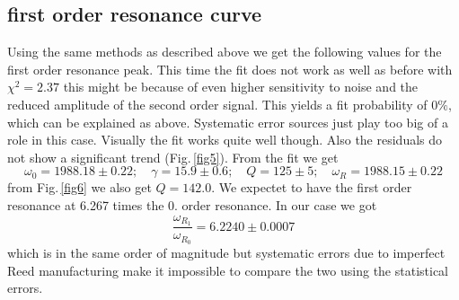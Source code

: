 \subsection{first order resonance curve}
Using the same methods as described above we get the following values for the first order resonance peak.
This time the fit does not work as well as before with $\chi^2 = 2.37$ this might be because of even higher sensitivity to noise and the reduced amplitude of the second order signal. This yields a fit probability of $0\%$, which can be explained as above. Systematic error sources just play too big of a role in this case. Visually the fit works quite well though. Also the residuals do not show a significant trend (Fig.\,\ref{fig5}). From the fit we get
\begin{equation}
	\omega_0 = 1988.18\pm0.22; \,\,\,\,\,\, \gamma = 15.9\pm0.6; \,\,\,\,\,\,Q = 125\pm5; \,\,\,\,\,\,\omega_R = 1988.15\pm0.22
\end{equation}
from Fig.\,\ref{fig6} we also get $Q = 142.0$. We expectet to have the first order resonance at 6.267 times the 0. order resonance. In our case we got
\begin{equation}
	\frac{\omega_{R_1}}{\omega_{R_0}} = 6.2240\pm0.0007
\end{equation}
which is in the same order of magnitude but systematic errors due to imperfect Reed manufacturing make it impossible to compare the two using the statistical errors. 

